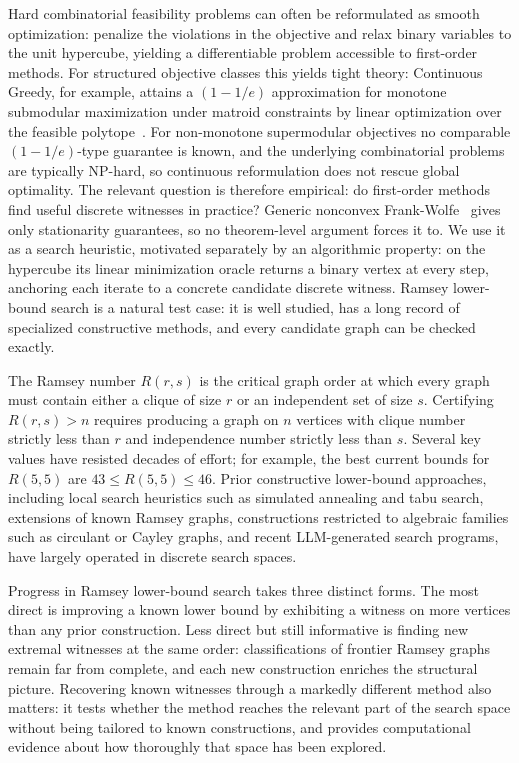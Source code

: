 \documentclass{article}
\begin{document}
Hard combinatorial feasibility problems can often be reformulated as smooth optimization: penalize the violations in the objective and relax binary variables to the unit hypercube, yielding a differentiable problem accessible to first-order methods. For structured objective classes this yields tight theory: Continuous Greedy, for example, attains a $(1-1/e)$ approximation for monotone submodular maximization under matroid constraints by linear optimization over the feasible polytope~\cite{vondrak2008optimal,calinescu2011maximizing}. For non-monotone supermodular objectives no comparable $(1-1/e)$-type guarantee is known, and the underlying combinatorial problems are typically NP-hard, so continuous reformulation does not rescue global optimality. The relevant question is therefore empirical: do first-order methods find useful discrete witnesses in practice? Generic nonconvex Frank-Wolfe~\cite{braun2022conditional} gives only stationarity guarantees, so no theorem-level argument forces it to. We use it as a search heuristic, motivated separately by an algorithmic property: on the hypercube its linear minimization oracle returns a binary vertex at every step, anchoring each iterate to a concrete candidate discrete witness. Ramsey lower-bound search is a natural test case: it is well studied, has a long record of specialized constructive methods, and every candidate graph can be checked exactly.

The Ramsey number $R(r,s)$ is the critical graph order at which every graph must contain either a clique of size $r$ or an independent set of size $s$. Certifying $R(r,s) > n$ requires producing a graph on $n$ vertices with clique number strictly less than $r$ and independence number strictly less than $s$. Several key values have resisted decades of effort; for example, the best current bounds for $R(5,5)$ are $43 \leq R(5,5) \leq 46$. Prior constructive lower-bound approaches, including local search heuristics such as simulated annealing and tabu search, extensions of known Ramsey graphs, constructions restricted to algebraic families such as circulant or Cayley graphs, and recent LLM-generated search programs, have largely operated in discrete search spaces.

Progress in Ramsey lower-bound search takes three distinct forms. The most direct is improving a known lower bound by exhibiting a witness on more vertices than any prior construction. Less direct but still informative is finding new extremal witnesses at the same order: classifications of frontier Ramsey graphs remain far from complete, and each new construction enriches the structural picture. Recovering known witnesses through a markedly different method also matters: it tests whether the method reaches the relevant part of the search space without being tailored to known constructions, and provides computational evidence about how thoroughly that space has been explored.
\end{document}
